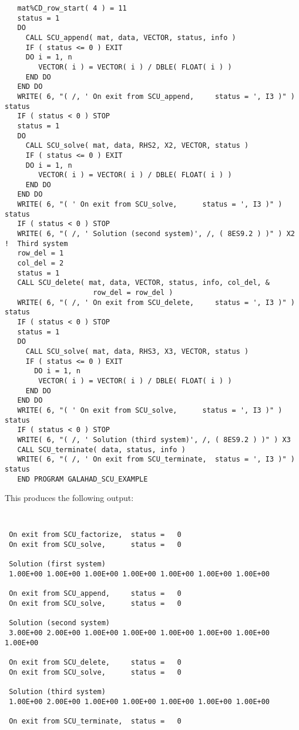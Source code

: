 \documentclass{galahad}
\begin{document}
{\begin{verbatim}
   mat%CD_row_start( 4 ) = 11
   status = 1
   DO
     CALL SCU_append( mat, data, VECTOR, status, info )
     IF ( status <= 0 ) EXIT
     DO i = 1, n
        VECTOR( i ) = VECTOR( i ) / DBLE( FLOAT( i ) )
     END DO
   END DO
   WRITE( 6, "( /, ' On exit from SCU_append,     status = ', I3 )" ) status
   IF ( status < 0 ) STOP
   status = 1
   DO
     CALL SCU_solve( mat, data, RHS2, X2, VECTOR, status )
     IF ( status <= 0 ) EXIT
     DO i = 1, n
        VECTOR( i ) = VECTOR( i ) / DBLE( FLOAT( i ) )
     END DO
   END DO
   WRITE( 6, "( ' On exit from SCU_solve,      status = ', I3 )" ) status
   IF ( status < 0 ) STOP
   WRITE( 6, "( /, ' Solution (second system)', /, ( 8ES9.2 ) )" ) X2
!  Third system
   row_del = 1
   col_del = 2
   status = 1
   CALL SCU_delete( mat, data, VECTOR, status, info, col_del, &
                     row_del = row_del )
   WRITE( 6, "( /, ' On exit from SCU_delete,     status = ', I3 )" ) status
   IF ( status < 0 ) STOP
   status = 1
   DO
     CALL SCU_solve( mat, data, RHS3, X3, VECTOR, status )
     IF ( status <= 0 ) EXIT
       DO i = 1, n
        VECTOR( i ) = VECTOR( i ) / DBLE( FLOAT( i ) )
     END DO
   END DO
   WRITE( 6, "( ' On exit from SCU_solve,      status = ', I3 )" ) status
   IF ( status < 0 ) STOP
   WRITE( 6, "( /, ' Solution (third system)', /, ( 8ES9.2 ) )" ) X3
   CALL SCU_terminate( data, status, info )
   WRITE( 6, "( /, ' On exit from SCU_terminate,  status = ', I3 )" ) status
   END PROGRAM GALAHAD_SCU_EXAMPLE
\end{verbatim}
}
This produces the following output:
{\tt
\begin{verbatim}
 On exit from SCU_factorize,  status =   0
 On exit from SCU_solve,      status =   0

 Solution (first system)
 1.00E+00 1.00E+00 1.00E+00 1.00E+00 1.00E+00 1.00E+00 1.00E+00

 On exit from SCU_append,     status =   0
 On exit from SCU_solve,      status =   0

 Solution (second system)
 3.00E+00 2.00E+00 1.00E+00 1.00E+00 1.00E+00 1.00E+00 1.00E+00 1.00E+00

 On exit from SCU_delete,     status =   0
 On exit from SCU_solve,      status =   0

 Solution (third system)
 1.00E+00 2.00E+00 1.00E+00 1.00E+00 1.00E+00 1.00E+00 1.00E+00

 On exit from SCU_terminate,  status =   0
\end{verbatim}
}
\end{document}
